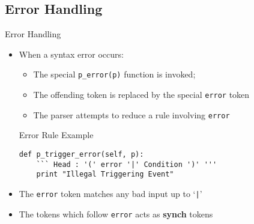 \subsection{Error Handling}
\begin{frame}[fragile]{Error Handling}
  \begin{itemize}
    \item When a syntax error occurs: 
    \begin{itemize}
      \item The special \texttt{p\_error(p)} function is invoked;
      \item The offending token is replaced by the special \texttt{error} 
      token
      \item The parser attempts to reduce a rule involving \texttt{error}
    \end{itemize}
\n
  \begin{exampleblock}{Error Rule Example}
\begin{verbatim}
def p_trigger_error(self, p):
    ``` Head : '(' error '|' Condition ')' '''
    print "Illegal Triggering Event"
\end{verbatim}
  \end{exampleblock}
\n
   \item The \texttt{error} token matches any bad input up to `\texttt{|}'
\n
    \item The tokens which follow \texttt{error} acts as \textbf{synch} 
    tokens

  \end{itemize}
%
%
\N\N
\end{frame}



